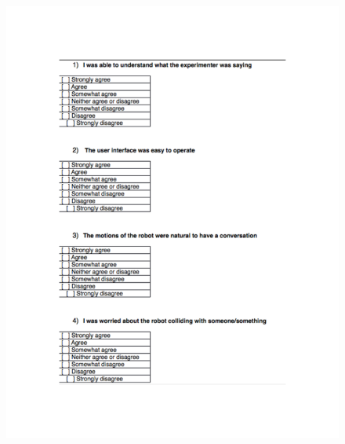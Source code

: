 \documentclass[12pt]{gatech-thesis}
\begin{document}
\begin{figure}[ht!]
\includegraphics[width=1.0\textwidth]{pics/telepresence_survey_0}
\end{figure}
\end{document}
